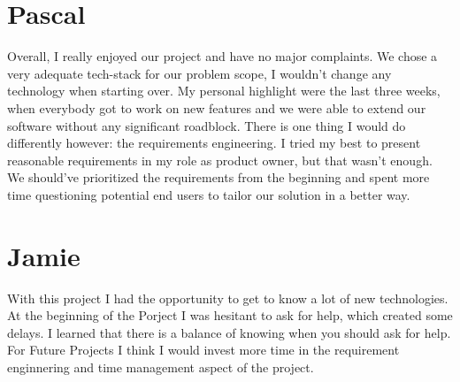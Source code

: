 \section{Pascal}
Overall, I really enjoyed our project and have no major complaints.
We chose a very adequate tech-stack for our problem scope, I wouldn't change any technology when starting over.
My personal highlight were the last three weeks, when everybody got to work on new features and we were able to extend our software without any significant roadblock.
There is one thing I would do differently however: the requirements engineering.
I tried my best to present reasonable requirements in my role as product owner, but that wasn't enough.
We should've prioritized the requirements from the beginning and spent more time questioning potential end users to tailor our solution in a better way.

\section{Jamie}
With this project I had the opportunity to get to know a lot of new technologies. At the beginning of the Porject I was hesitant to ask for help, which created some delays. 
I learned that there is a balance of knowing when you should ask for help. For Future Projects I think I would invest more time in the requirement enginnering and time management
aspect of the project. 